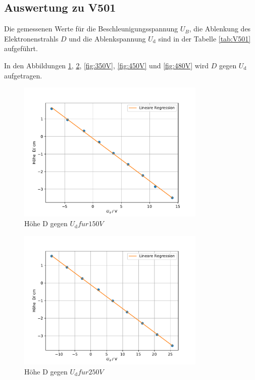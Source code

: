 \subsection{Auswertung zu V501}


Die gemessenen Werte für die Beschleunigungsspannung $U_{B}$, die Ablenkung des Elektronenstrahls $D$ und die Ablenkspannung $U_{\text{d}}$ sind in der Tabelle
\ref{tab:V501} aufgeführt.

In den Abbildungen \ref{fig:150V}, \ref{fig:250V}, \ref{fig:350V}, \ref{fig:450V} und \ref{fig:480V} wird $D$ gegen $U_{\text{d}}$ aufgetragen.

\begin{figure}[h!]
  \centering
  \includegraphics[width=0.8\textwidth]{150V.pdf}
  \caption{Höhe D gegen $U_{\text{d}} f\ddot{u}r 150V$}
  \label{fig:150V}
\end{figure}

\begin{figure}[h!]
 \centering
 \includegraphics[width=0.8\textwidth]{250V.pdf}
 \caption{Höhe D gegen $U_{\text{d}} f\ddot{u}r 250V$}
 \label{fig:250V}
\end{figure}

